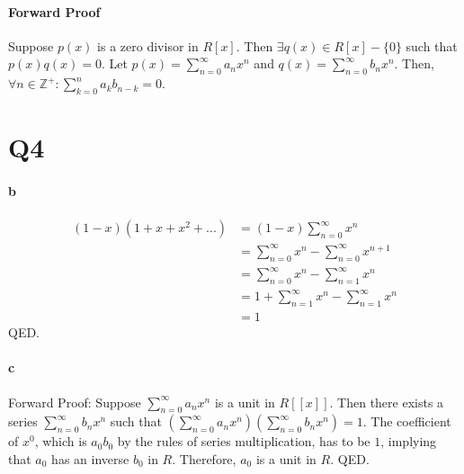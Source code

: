 \documentclass[]{article}
\begin{document}
	\paragraph{Forward Proof}
	Suppose $p(x)$ is a zero divisor in $R[x]$.\newline
	Then $\exists q(x) \in R[x] - \{0\}$ such that $p(x)q(x) = 0$.\newline
	Let $p(x) = \sum_{n = 0}^{\infty} a_nx^n$ and $q(x) = \sum_{n = 0}^{\infty} b_nx^n$.\newline
	Then, $\forall n \in \mathbb{Z}^+: \sum_{k = 0}^{n} a_kb_{n-k} = 0$.

\section*{Q4}
	\paragraph{b}
	\begin{align*}
	(1-x)(1 + x + x^2 + ...)
		&= (1 - x)\sum_{n = 0}^{\infty} x^n \\
		&= \sum_{n = 0}^{\infty} x^n - \sum_{n = 0}^{\infty} x^{n+1} \\
		&= \sum_{n = 0}^{\infty} x^n - \sum_{n = 1}^{\infty} x^n \\
		&= 1 + \sum_{n = 1}^{\infty} x^n - \sum_{n = 1}^{\infty} x^n \\
		&= 1
	\end{align*}
	QED.
	\paragraph{c}
	Forward Proof:\newline
	Suppose $\sum_{n=0}^{\infty} a_nx^n$ is a unit in $R[[x]]$.\newline
	Then there exists a series $\sum_{n=0}^{\infty} b_nx^n$ such that $(\sum_{n=0}^{\infty} a_nx^n)(\sum_{n=0}^{\infty} b_nx^n) = 1$.\newline
	The coefficient of $x^0$, which is $a_0b_0$ by the rules of series multiplication, has to be $1$, implying that $a_0$ has an inverse $b_0$ in $R$.\newline
	Therefore, $a_0$ is a unit in $R$.\newline
	QED.\newline
	
\end{document}
